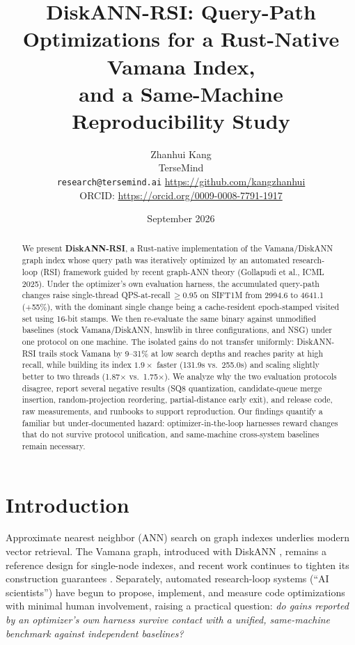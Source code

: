 \documentclass[11pt]{article}
\title{DiskANN-RSI: Query-Path Optimizations for a Rust-Native Vamana Index,\\and a Same-Machine Reproducibility Study}
\author{
  Zhanhui Kang\\
  TerseMind\\
  \texttt{research@tersemind.ai} \quad \url{https://github.com/kangzhanhui}\\
  ORCID: \url{https://orcid.org/0009-0008-7791-1917}
}
\date{September 2026}
\begin{document}
\maketitle

\begin{abstract}
We present \textbf{DiskANN-RSI}, a Rust-native implementation of the Vamana/DiskANN
graph index whose query path was iteratively optimized by an automated
research-loop (RSI) framework guided by recent graph-ANN theory
(Gollapudi et al., ICML 2025). Under the optimizer's own evaluation harness,
the accumulated query-path changes raise single-thread
QPS-at-recall\,$\ge 0.95$ on SIFT1M from 2994.6 to 4641.1 (+55\%), with the
dominant single change being a cache-resident epoch-stamped visited set using
16-bit stamps. We then re-evaluate the same binary against unmodified
baselines (stock Vamana/DiskANN, hnswlib in three configurations, and NSG)
under one protocol on one machine. The isolated gains do not transfer
uniformly: DiskANN-RSI trails stock Vamana by 9--31\% at low search depths and
reaches parity at high recall, while building its index $1.9\times$ faster
(131.9s vs.\ 255.0s) and scaling slightly better to two threads (1.87$\times$
vs.\ 1.75$\times$). We analyze why the two evaluation protocols disagree,
report several negative results (SQ8 quantization, candidate-queue merge
insertion, random-projection reordering, partial-distance early exit), and
release code, raw measurements, and runbooks to support reproduction. Our
findings quantify a familiar but under-documented hazard: optimizer-in-the-loop
harnesses reward changes that do not survive protocol unification, and
same-machine cross-system baselines remain necessary.
\end{abstract}

\section{Introduction}
Approximate nearest neighbor (ANN) search on graph indexes underlies modern
vector retrieval. The Vamana graph, introduced with DiskANN
\cite{subramanya2019diskann}, remains a reference design for single-node
indexes, and recent work continues to tighten its construction guarantees
\cite{gollapudi2025sort}. Separately, automated research-loop systems
(``AI scientists'') \cite{lu2024aiscientist,yamada2025aiscientistv2} have
begun to propose, implement, and measure code optimizations with minimal
human involvement, raising a practical question: \emph{do gains reported by an
optimizer's own harness survive contact with a unified, same-machine
benchmark against independent baselines?}
\end{document}
